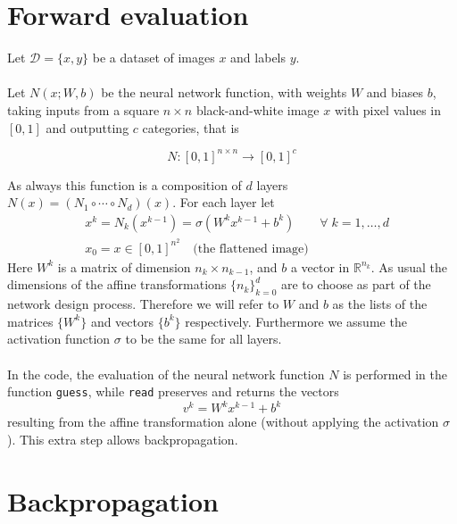 \documentclass [a4paper,12pt]{article}
\begin{document}
\section{Forward evaluation}

Let $\mathcal{D} = \{x, y\}$ be a dataset of images $x$ and labels $y$. 
\\\\
Let $N(x; W, b)$ be the neural network function, with weights $W$ and biases $b$, taking inputs from a square $n \times n$ black-and-white image $x$ with pixel values in $[0,1]$ and outputting $c$ categories, that is

$$
N: [0,1]^{n \times n} \longrightarrow [0,1]^c
$$

As always this function is a composition of $d$ layers $N(x) = (N_1 \circ \cdots \circ N_d)(x)$. For each layer let
\begin{align*}
&x^k = N_k(x^{k-1}) = \sigma(W^k x^{k-1} + b^k) \qquad \forall \; k = 1, \dots, d \\
&x_0 = x \in [0,1]^{n^2} \quad \text{(the flattened image)}
\end{align*}
Here $W^k$ is a matrix of dimension $n_k \times n_{k-1}$, and $b$ a vector in $\mathbb{R}^{n_k}$. As usual the dimensions of the affine transformations $\{n_k\}_{k=0}^d$ are to choose as part of the network design process.
Therefore we will refer to $W$ and $b$ as the lists of the matrices $\{W^k\}$ and vectors $\{b^k\}$ respectively.
Furthermore we assume the activation function $\sigma$ to be the same for all layers.
\\\\
In the code, the evaluation of the neural network function $N$ is performed in the function \verb|guess|, while \verb|read| preserves and returns the vectors
$$
v^k = W^k x^{k-1} + b^k
$$
resulting from the affine transformation alone (without applying the activation $\sigma$). This extra step allows backpropagation.


\section{Backpropagation}
\end{document}
